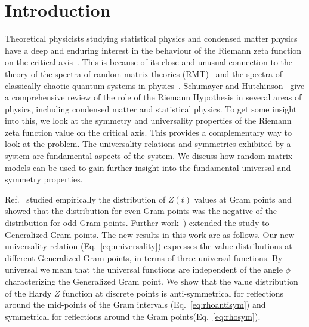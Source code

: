 \documentclass[twoside]{article}
\begin{document}


\section{Introduction}
Theoretical physicists studying statistical physics and condensed matter physics have a 
deep and enduring interest in the behaviour of the 
Riemann zeta function on the critical axis~\cite{Shanker 2006}. This is because of
its close and unusual connection  to the theory of the spectra of random matrix theories 
(RMT)~\cite{Wigner 1967, Gaudin 1960, Gaudin 1961, Dyson 1962, Bogomolny 1995, Bogomolny 1996, Katz 1999, Keating 2000a, Keating 2000b, Conrey 2000, 
Hughes 2000, Hughes 2001, Conrey 2002, Conrey 2003} 
and the spectra of classically chaotic quantum systems in 
physics~\cite{Berry 1985,Berry 1986,Berry 1987,Berry 1988}. Schumayer and
Hutchinson~\cite{Schumayer 2011} give a comprehensive review of the role
of the Riemann Hypothesis in several areas of physics, including condensed matter
and statistical physics. To get some insight into this, 
we look at the symmetry and universality properties of the Riemann zeta function value 
on the critical axis. This provides a complementary way to look at the problem.
The universality relations and symmetries exhibited by a system are fundamental aspects 
of the system. We discuss how random matrix models can be used to gain further insight
into the fundamental universal and symmetry properties.

Ref.~\cite{Shanker 2018a} studied empirically the distribution of $Z(t)$ values at 
Gram points and
showed  that the distribution for even Gram points was the negative  of the 
distribution for odd Gram points. 
Further work~\cite{Shanker 2018b}) extended the study to Generalized Gram points. 
The new results in this work are as follows. 
Our new universality relation (Eq.~\ref{eq:universality}) expresses the value distributions 
at different Generalized Gram points, in terms of three universal functions.
By universal we mean that the universal functions are independent of the angle $\phi$
characterizing the  Generalized Gram point.
We show that the  value
distribution of the Hardy $Z$ function at discrete points is anti-symmetrical 
for reflections around the mid-points 
of the Gram intervals (Eq.~\ref{eq:rhoantisym}) and symmetrical for reflections 
around the Gram points(Eq.~\ref{eq:rhosym}). 
\end{document}

